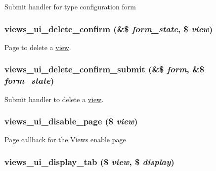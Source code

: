Submit handler for type configuration form \hypertarget{admin_8inc_6812d24763aef0dcc3bf12fd507ce889}{
\subsubsection[{views\_\-ui\_\-delete\_\-confirm}]{\setlength{\rightskip}{0pt plus 5cm}views\_\-ui\_\-delete\_\-confirm (\&\$ {\em form\_\-state}, \/  \$ {\em view})}}
\label{admin_8inc_6812d24763aef0dcc3bf12fd507ce889}


Page to delete a \hyperlink{classview}{view}. \hypertarget{admin_8inc_5f90c80772fbdba6261594d21157d989}{
\subsubsection[{views\_\-ui\_\-delete\_\-confirm\_\-submit}]{\setlength{\rightskip}{0pt plus 5cm}views\_\-ui\_\-delete\_\-confirm\_\-submit (\&\$ {\em form}, \/  \&\$ {\em form\_\-state})}}
\label{admin_8inc_5f90c80772fbdba6261594d21157d989}


Submit handler to delete a \hyperlink{classview}{view}. \hypertarget{admin_8inc_46be1cf8820f694e4d4fd2558167b9bb}{
\subsubsection[{views\_\-ui\_\-disable\_\-page}]{\setlength{\rightskip}{0pt plus 5cm}views\_\-ui\_\-disable\_\-page (\$ {\em view})}}
\label{admin_8inc_46be1cf8820f694e4d4fd2558167b9bb}


Page callback for the Views enable page \hypertarget{admin_8inc_1666f1ec5a2b78fd56d408c129007e43}{
\subsubsection[{views\_\-ui\_\-display\_\-tab}]{\setlength{\rightskip}{0pt plus 5cm}views\_\-ui\_\-display\_\-tab (\$ {\em view}, \/  \$ {\em display})}}
\label{admin_8inc_1666f1ec5a2b78fd56d408c129007e43}


